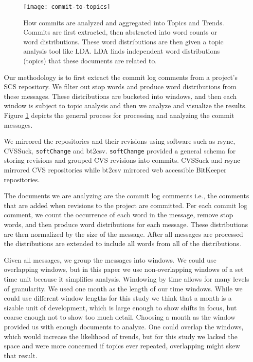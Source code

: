 \documentclass[times, 10pt,twocolumn]{article}
\newcommand{\shrinkit}{\vspace*{-.3em}}
\begin{document}
\shrinkit
{}
\shrinkit


\begin{figure}[t]
  \centering
  \texttt{[image: commit-to-topics]} 
  \caption{How commits are analyzed and aggregated into Topics and Trends. Commits are first extracted, then abstracted into word counts or word distributions. These word distributions are then given a topic analysis tool like LDA. LDA finds independent word distributions (topics) that these documents are related to.}
  \label{fig:commits}
\end{figure}



Our methodology is to first extract the commit log comments from a
project's SCS repository. We filter out stop words and produce word
distributions from these messages. These distributions are bucketed
into windows, and then each window is subject to topic analysis and
then we analyze and visualize the results. Figure \ref{fig:commits}
depicts the general process for processing and analyzing the commit
messages.




\shrinkit
{}
\shrinkit



We mirrored the repositories and their revisions using software such
as rsync, CVSSuck, \texttt{softChange} and bt2csv.
\texttt{softChange} provided a general schema for storing revisions
and grouped CVS revisions into commits. CVSSuck and rsync mirrored CVS
repositories while bt2csv mirrored web accessible BitKeeper
repositories.



The documents we are analyzing are the commit log comments i.e., the
comments that are added when revisions to the project are committed.
Per each commit log comment, we count the occurrence of each word in
the message, remove stop words, and then produce word distributions
for each message.  These distributions are then normalized by the size
of the message. After all messages are processed the distributions are
extended to include all words from all of the distributions.

\shrinkit
{}
\shrinkit

Given all messages, we group the messages into windows. We could use
overlapping windows, but in this paper we use non-overlapping windows
of a set time unit because it simplifies analysis.  Windowing by time
allows for many levels of granularity.  We used one month as the
length of our time windows. While we could use different window
lengths for this study we think that a month is a sizable unit of
development, which is large enough to show shifts in focus, but coarse
enough not to show too much detail. Choosing a month as the window
provided us with enough documents to analyze. One could overlap the
windows, which would increase the likelihood of trends, but for this
study we lacked the space and were more concerned if topics ever
repeated, overlapping might skew that result.
\end{document}
